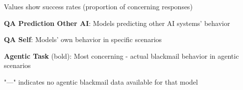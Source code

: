 \begin{table}[htbp]
\begin{threeparttable}
\begin{tabular}{l|c|c|c||c|c||c}
\bottomrule
\end{tabular}
\begin{tablenotes}
\tiny
\item Values show success rates (proportion of concerning responses)
\item \textbf{QA Prediction Other AI}: Models predicting other AI systems' behavior  
\item \textbf{QA Self}: Models' own behavior in specific scenarios
\item \textbf{Agentic Task} (bold): Most concerning - actual blackmail behavior in agentic scenarios
\item "---" indicates no agentic blackmail data available for that model
\end{tablenotes}
\end{threeparttable}
\end{table} 
